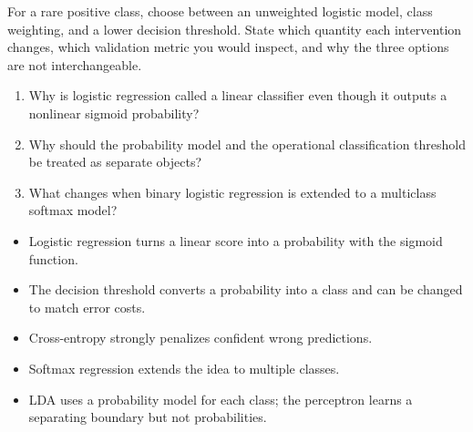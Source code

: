 \begin{decisionmemo}
For a rare positive class, choose between an unweighted logistic model, class weighting, and a lower decision threshold. State which quantity each intervention changes, which validation metric you would inspect, and why the three options are not interchangeable.
\end{decisionmemo}


\begin{quickcheck}
\begin{enumerate}
  \item Why is logistic regression called a linear classifier even though it outputs a nonlinear sigmoid probability?
  \item Why should the probability model and the operational classification threshold be treated as separate objects?
  \item What changes when binary logistic regression is extended to a multiclass softmax model?
\end{enumerate}
\end{quickcheck}

\begin{chapterrecap}
\begin{itemize}
  \item Logistic regression turns a linear score into a probability with the sigmoid function.
  \item The decision threshold converts a probability into a class and can be changed to match error costs.
  \item Cross-entropy strongly penalizes confident wrong predictions.
  \item Softmax regression extends the idea to multiple classes.
  \item LDA uses a probability model for each class; the perceptron learns a separating boundary but not probabilities.
\end{itemize}
\end{chapterrecap}
